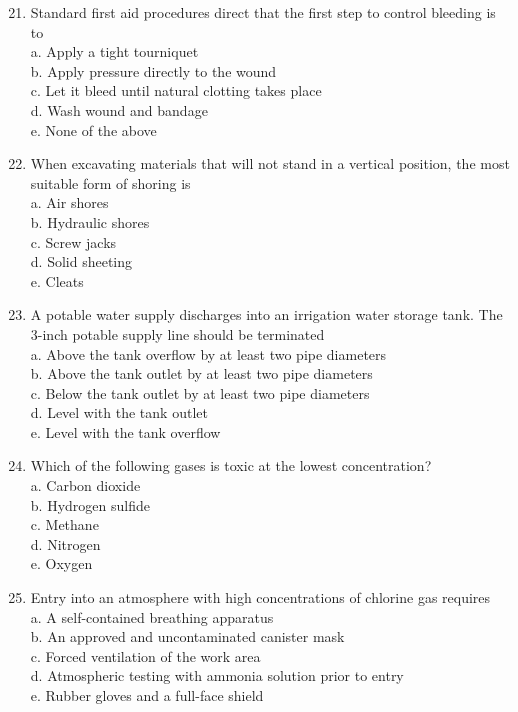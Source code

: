 \documentclass[10pt]{article}
\begin{document}
\begin{enumerate}
\begin{enumerate}
\begin{enumerate}
  \setcounter{enumi}{20}
  \item Standard first aid procedures direct that the first step to control bleeding is to\\
a. Apply a tight tourniquet\\
b. Apply pressure directly to the wound\\
c. Let it bleed until natural clotting takes place\\
d. Wash wound and bandage\\
e. None of the above\\

  \item When excavating materials that will not stand in a vertical position, the most suitable form of shoring is\\
a. Air shores\\
b. Hydraulic shores\\
c. Screw jacks\\
d. Solid sheeting\\
e. Cleats\\

  \item A potable water supply discharges into an irrigation water storage tank. The 3-inch potable supply line should be terminated\\
a. Above the tank overflow by at least two pipe diameters\\
b. Above the tank outlet by at least two pipe diameters\\
c. Below the tank outlet by at least two pipe diameters\\
d. Level with the tank outlet\\
e. Level with the tank overflow\\

  \item Which of the following gases is toxic at the lowest concentration?\\
a. Carbon dioxide\\
b. Hydrogen sulfide\\
c. Methane\\
d. Nitrogen\\
e. Oxygen\\

  \item Entry into an atmosphere with high concentrations of chlorine gas requires\\
a. A self-contained breathing apparatus\\
b. An approved and uncontaminated canister mask\\
c. Forced ventilation of the work area\\
d. Atmospheric testing with ammonia solution prior to entry\\
e. Rubber gloves and a full-face shield\\


\end{enumerate}
\end{enumerate}
\end{enumerate}
\end{document}
